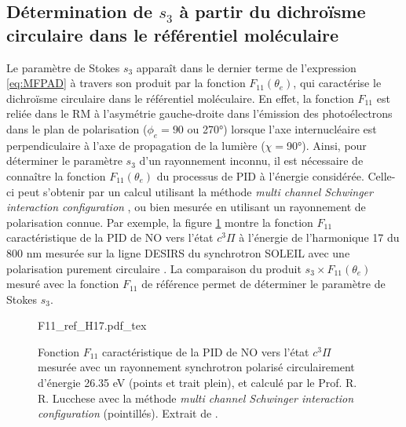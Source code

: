 \subsection{Détermination de $s_3$ à partir du dichroïsme circulaire dans le référentiel moléculaire}
Le paramètre de Stokes $s_3$ apparaît dans le dernier terme de l'expression \ref{eq:MFPAD} à travers son produit par la fonction $F_{11}(\theta_e)$, qui caractérise le dichroïsme circulaire dans le référentiel moléculaire. En effet, la fonction $F_{11}$ est reliée dans le RM à l'asymétrie gauche-droite dans l'émission des photoélectrons dans le plan de polarisation ($\phi_e = 90$ ou 270°) lorsque l'axe internucléaire est perpendiculaire à l'axe de propagation de la lumière ($\chi =$90°). Ainsi, pour déterminer le paramètre $s_3$ d'un rayonnement inconnu, il est nécessaire de connaître la fonction $F_{11}(\theta_e)$ du processus de PID à l'énergie considérée. Celle-ci peut s'obtenir par un calcul utilisant la méthode \textit{multi channel Schwinger interaction configuration} , ou bien mesurée en utilisant un rayonnement de polarisation connue. Par exemple, la figure \ref{fig:F11_ref_H17} montre la fonction $F_{11}$ caractéristique de la PID de NO vers l'état $c ^3\Pi$ à l'énergie de l'harmonique 17 du 800 nm mesurée sur la ligne DESIRS du synchrotron SOLEIL avec une polarisation purement circulaire . La comparaison du produit $s_3 \times F_{11}(\theta_e)$ mesuré avec la fonction $F_{11}$ de référence permet de déterminer le paramètre de Stokes $s_3$. 

\begin{figure}
\centering
\def\svgwidth{0.6\textwidth}
{F11_ref_H17.pdf_tex}
\caption{Fonction $F_{11}$ caractéristique de la PID de NO vers l'état $c ^3\Pi$ mesurée avec un rayonnement synchrotron polarisé circulairement d'énergie 26.35 eV (points et trait plein), et calculé par le Prof. R. R. Lucchese avec la méthode \textit{multi channel Schwinger interaction configuration} (pointillés). Extrait de .}
\label{fig:F11_ref_H17}
\end{figure}

